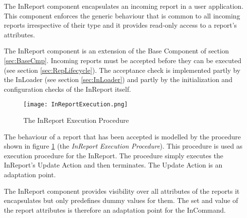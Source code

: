 The InReport component encapsulates an incoming report in a user application. This component enforces the generic behaviour that is common to all incoming reports irrespective of their type and it provides read-only access to a report's attributes.

The InReport component is an extension of the Base Component of section \ref{sec:BaseCmp}. Incoming reports must be accepted before they can be executed (see section \ref{sec:RepLifecycle}). The acceptance check is implemented partly by the InLoader (see section \ref{sec:InLoader}) and partly by the initialization and configuration checks of the InReport itself.

\begin{figure}[h]
 \centering
 \texttt{[image: InReportExecution.png]}
 \caption{The InReport Execution Procedure}
 \label{fig:InReportExecution}
\end{figure}

The behaviour of a report that has been accepted is modelled by the procedure shown in figure \ref{fig:InReportExecution} (the \textit{InReport Execution Procedure}). This procedure is used as execution procedure for the InReport. The procedure simply executes the InReport's Update Action and then terminates. The Update Action is an adaptation point.

The InReport component provides visibility over all attributes of the reports it encapsulates but only predefines dummy values for them. The set and value of the report attributes is therefore an adaptation point for the InCommand.

